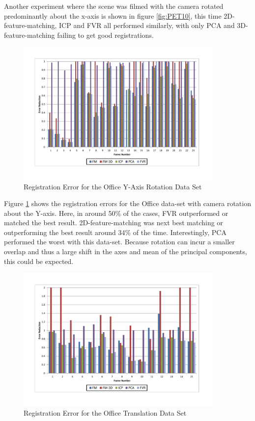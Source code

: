 Another experiment where the scene was filmed with the camera rotated predominantly about the x-axis is shown in figure \ref{fig:PET10}, this time 2D-feature-matching, ICP and FVR all performed similarly, with only PCA and 3D-feature-matching failing to get good registrations. 

\begin{figure}[!htb]
\centering
\includegraphics[width=4.0in]{images/results/Office_Texture_Rotation}
\caption{Registration Error for the Office Y-Axis Rotation Data Set}
\label{fig:PET11}
\end{figure}

Figure \ref{fig:PET11} shows the registration errors for the Office data-set with camera rotation about the Y-axis. Here, in around 50\% of the cases, FVR outperformed or matched the best result. 2D-feature-matching was next best matching or outperforming the best result around 34\% of the time. Interestingly, PCA performed the worst with this data-set. Because rotation can incur a smaller overlap and thus a large shift in the axes and mean of the principal components, this could be expected. \\

\begin{figure}[!htb]
\centering
\includegraphics[width=4.0in]{images/results/Office_Texture_Translation}
\caption{Registration Error for the Office Translation Data Set}
\label{fig:PET12}
\end{figure}

